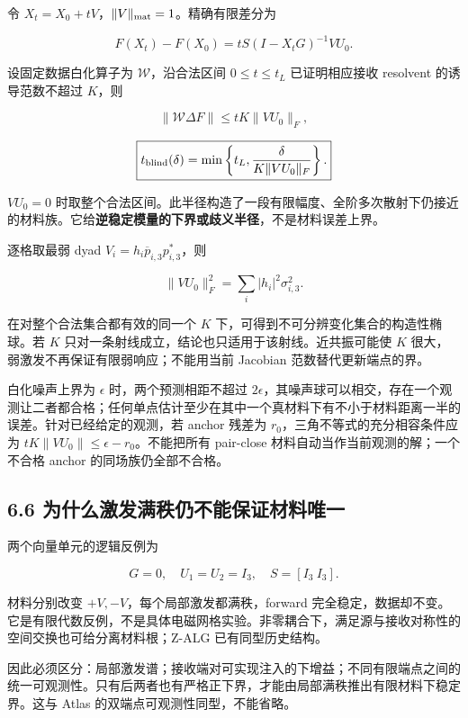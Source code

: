 \documentclass[11pt,a4paper]{article}
\begin{document}
令 \(X_t=X_0+tV\)，\(\|V\|_{\rm mat}=1\)。精确有限差分为

\[
F(X_t)-F(X_0)=tS(I-X_tG)^{-1}VU_0.
\]

设固定数据白化算子为 \(\mathcal W\)，沿合法区间 \(0\le t\le t_L\)
已证明相应接收 resolvent 的诱导范数不超过 \(K\)，则

\[
\|\mathcal W\Delta F\|\le tK\|VU_0\|_F,
\]

\[
\boxed{t_{\rm blind}(\delta)
=\min\left\{t_L,\frac{\delta}{K\|VU_0\|_F}\right\}.}
\]

\(VU_0=0\)
时取整个合法区间。此半径构造了一段有限幅度、全阶多次散射下仍接近的材料族。它给\textbf{逆稳定模量的下界或歧义半径}，不是材料误差上界。

逐格取最弱 dyad \(V_i=h_i\overline p_{i,3}p_{i,3}^*\)，则

\[
\|VU_0\|_F^2=\sum_i|h_i|^2\sigma_{i,3}^2.
\]

在对整个合法集合都有效的同一个 \(K\)
下，可得到不可分辨变化集合的构造性椭球。若 \(K\)
只对一条射线成立，结论也只适用于该射线。近共振可能使 \(K\)
很大，弱激发不再保证有限弱响应；不能用当前 Jacobian
范数替代更新端点的界。

白化噪声上界为 \(\epsilon\) 时，两个预测相距不超过
\(2\epsilon\)，其噪声球可以相交，存在一个观测让二者都合格；任何单点估计至少在其中一个真材料下有不小于材料距离一半的误差。针对已经给定的观测，若
anchor 残差为 \(r_0\)，三角不等式的充分相容条件应为
\(tK\|VU_0\|\le\epsilon-r_0\)。不能把所有 pair-close
材料自动当作当前观测的解；一个不合格 anchor 的同场族仍全部不合格。

\hypertarget{ux4e3aux4ec0ux4e48ux6fc0ux53d1ux6ee1ux79e9ux4ecdux4e0dux80fdux4fddux8bc1ux6750ux6599ux552fux4e00}{%
\subsection{6.6
为什么激发满秩仍不能保证材料唯一}\label{ux4e3aux4ec0ux4e48ux6fc0ux53d1ux6ee1ux79e9ux4ecdux4e0dux80fdux4fddux8bc1ux6750ux6599ux552fux4e00}}

两个向量单元的逻辑反例为

\[
G=0,\quad U_1=U_2=I_3,\quad S=[I_3\ I_3].
\]

材料分别改变 \(+V,-V\)，每个局部激发都满秩，forward
完全稳定，数据却不变。它是有限代数反例，不是具体电磁网格实验。非零耦合下，满足源与接收对称性的空间交换也可给分离材料根；Z-ALG
已有同型历史结构。

因此必须区分：局部激发谱；接收端对可实现注入的下增益；不同有限端点之间的统一可观测性。只有后两者也有严格正下界，才能由局部满秩推出有限材料下稳定界。这与
Atlas 的双端点可观测性同型，不能省略。
\end{document}
